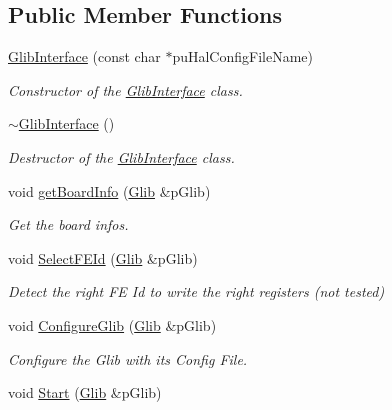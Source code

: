 \subsection*{Public Member Functions}
\begin{DoxyCompactItemize}
\item 
\hyperlink{class_ph2___hw_interface_1_1_glib_interface_a4aebde48748debad7e261c654c2c6fd8}{Glib\-Interface} (const char $\ast$pu\-Hal\-Config\-File\-Name)
\begin{DoxyCompactList}\small\item\em Constructor of the \hyperlink{class_ph2___hw_interface_1_1_glib_interface}{Glib\-Interface} class. \end{DoxyCompactList}\item 
\hyperlink{class_ph2___hw_interface_1_1_glib_interface_a1182c81cb29bca33b23a2c9f662df2ed}{$\sim$\-Glib\-Interface} ()
\begin{DoxyCompactList}\small\item\em Destructor of the \hyperlink{class_ph2___hw_interface_1_1_glib_interface}{Glib\-Interface} class. \end{DoxyCompactList}\item 
void \hyperlink{class_ph2___hw_interface_1_1_glib_interface_a51dd2e5a8128fd01a41c4d6b204df948}{get\-Board\-Info} (\hyperlink{class_ph2___hw_description_1_1_glib}{Glib} \&p\-Glib)
\begin{DoxyCompactList}\small\item\em Get the board infos. \end{DoxyCompactList}\item 
void \hyperlink{class_ph2___hw_interface_1_1_glib_interface_ad53d40d7cfea163bd3dcd04e233a02e3}{Select\-F\-E\-Id} (\hyperlink{class_ph2___hw_description_1_1_glib}{Glib} \&p\-Glib)
\begin{DoxyCompactList}\small\item\em Detect the right F\-E Id to write the right registers (not tested) \end{DoxyCompactList}\item 
void \hyperlink{class_ph2___hw_interface_1_1_glib_interface_aad68569190ea9b318b5be1abae4fd23f}{Configure\-Glib} (\hyperlink{class_ph2___hw_description_1_1_glib}{Glib} \&p\-Glib)
\begin{DoxyCompactList}\small\item\em Configure the Glib with its Config File. \end{DoxyCompactList}\item 
void \hyperlink{class_ph2___hw_interface_1_1_glib_interface_a0706eb396293fe5c8c717c5d0ab82165}{Start} (\hyperlink{class_ph2___hw_description_1_1_glib}{Glib} \&p\-Glib)

\end{DoxyCompactItemize}
